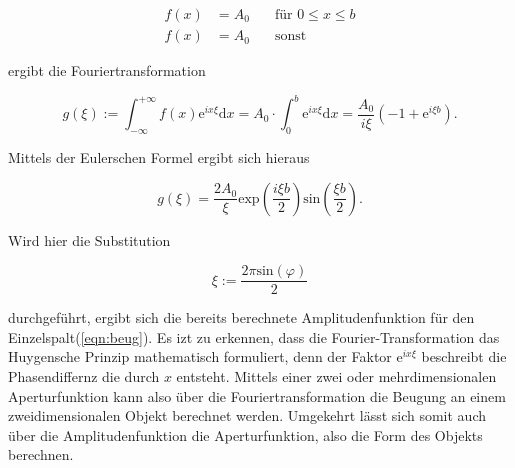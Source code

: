         \begin{align*}
            f(x) & = A_0 \quad & \text{für } 0\leq x \leq b\\
            f(x) & = A_0 \quad & \text{sonst}
        \end{align*}

        \noindent ergibt die Fouriertransformation

        \begin{equation*}
            g(\xi) := \int_{-\infty}^{+\infty} f(x) \text{e}^{i x \xi} \text{d} x = A_0 \cdot \int_0^b \text{e}^{i x \xi} \text{d} x =
            \frac{A_0}{i \xi} \left( -1 + \text{e}^{i \xi b} \right) .
        \end{equation*}

        \noindent Mittels der Eulerschen Formel ergibt sich hieraus 

        \begin{equation*}
            g(\xi) = \frac{2 A_0}{\xi} \text{exp} \left( \frac{i \xi b}{2} \right) \text{sin} \left( \frac{\xi b}{2} \right) .
        \end{equation*}

        \noindent Wird hier die Substitution 

        \begin{equation}
            \xi := \frac{2 \pi \text{sin}(\varphi)}{2} 
        \end{equation}

        \noindent durchgeführt, ergibt sich die bereits berechnete Amplitudenfunktion für den Einzelspalt(\ref{eqn:beug}).
        Es izt zu erkennen, dass die Fourier-Transformation das Huygensche Prinzip mathematisch formuliert, denn der Faktor 
        $\text{e}^{i x \xi}$ beschreibt die Phasendiffernz die durch $x$ entsteht. Mittels einer zwei oder mehrdimensionalen 
        Aperturfunktion kann also über die Fouriertransformation die Beugung an einem zweidimensionalen Objekt berechnet werden. 
        Umgekehrt lässt sich somit auch über die Amplitudenfunktion die Aperturfunktion, also die Form des Objekts berechnen.


        



    





    